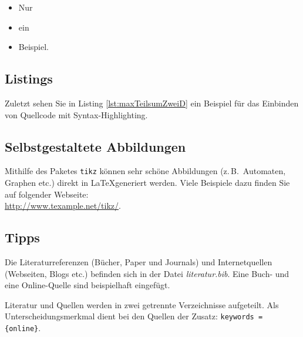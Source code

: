 \begin{itemize}
	\item Nur
	\item ein
	\item Beispiel.
\end{itemize}

\subsection{Listings}
Zuletzt sehen Sie in Listing \ref{lst:maxTeilsumZweiD} ein Beispiel für das Einbinden von Quellcode mit Syntax-Highlighting.

\vspace{1em}


\subsection{Selbstgestaltete Abbildungen}
Mithilfe des Paketes \texttt{tikz} können sehr schöne Abbildungen (z.\,B.\ Automaten, Graphen etc.) direkt in \LaTeX generiert werden. Viele Beispiele dazu finden Sie auf folgender Webseite:\\[1em]
\hspace*{3cm}\url{http://www.texample.net/tikz/}.

\subsection{Tipps}
Die Literaturreferenzen (Bücher, Paper und Journals) und Internetquellen (Webseiten, Blogs etc.) befinden sich in der Datei \textit{literatur.bib}. Eine Buch- und eine Online-Quelle sind beispielhaft eingefügt.  %

Literatur und Quellen werden in zwei getrennte Verzeichnisse aufgeteilt. Als Unterscheidungsmerkmal dient bei den Quellen der Zusatz: \texttt{keywords = \{online\}}.

\pagebreak